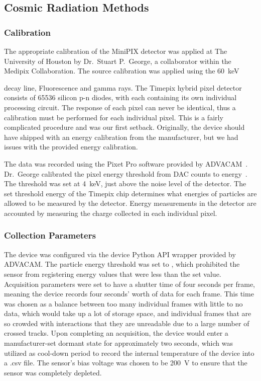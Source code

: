 \subsection{Cosmic Radiation Methods}
\label{sec:Minipix Testing}
	
	\subsubsection{Calibration}   
	The appropriate calibration of the MiniPIX detector was applied at The University of Houston by Dr.~Stuart P.~George, a collaborator within the Medipix Collaboration. The source calibration was applied using the \SI{60}{\keV} { decay line,  Fluorescence and  gamma rays. The Timepix hybrid pixel detector consists of \num{65536} silicon p-n diodes, with each containing its own individual processing circuit. The response of each pixel can never be identical, thus a calibration must be performed for each individual pixel. This is a fairly complicated procedure and was our first setback. Originally, the device should have shipped with an energy calibration from the manufacturer, but we had issues with the provided energy calibration.

	The data was recorded using the Pixet Pro software provided by ADVACAM~\cite{advacam}. Dr.~George calibrated the pixel energy threshold from DAC counts to energy~\cite{stuartthesis}. The threshold was set at \SI{4}{\keV}, just above the noise level of the detector. The set threshold energy of the Timepix chip determines what energies of particles are allowed to be measured by the detector. Energy measurements in the detector are accounted by measuring the charge collected in each individual pixel. 

	\subsubsection{Collection Parameters}
  	The device was configured via the device Python API wrapper provided by ADVACAM. The particle energy threshold was set to \MPThreshold, which prohibited the sensor from registering energy values that were less than the set value. Acquisition parameters were set to have a shutter time of four seconds per frame, meaning the device records four seconds' worth of data for each frame. This time was chosen as a balance between too many individual frames with little to no data, which would take up a lot of storage space, and individual frames that are so crowded with interactions that they are unreadable due to a large number of crossed tracks. Upon completing an acquisition, the device would enter a manufacturer-set dormant state for approximately two seconds, which was utilized as cool-down period to record the internal temperature of the device into a .csv file. The sensor's bias voltage was chosen to be \SI{200}{\volt} to ensure that the sensor was completely depleted. 

}
